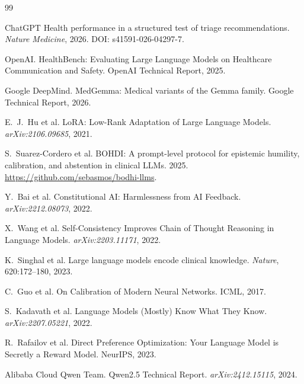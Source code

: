 \documentclass[10pt,letterpaper]{article}
\begin{document}
\begin{thebibliography}{99}
\small

ChatGPT Health performance in a structured test of triage
recommendations. \emph{Nature Medicine}, 2026. DOI: s41591-026-04297-7.

OpenAI. HealthBench: Evaluating Large Language Models on Healthcare
Communication and Safety. OpenAI Technical Report, 2025.

Google DeepMind. MedGemma: Medical variants of the Gemma family.
Google Technical Report, 2026.

E.~J.~Hu et al. LoRA: Low-Rank Adaptation of Large Language Models.
\emph{arXiv:2106.09685}, 2021.

S.~Suarez-Cordero et al. BOHDI: A prompt-level protocol for epistemic
humility, calibration, and abstention in clinical LLMs. 2025.
\url{https://github.com/sebasmos/bodhi-llms}.

Y.~Bai et al. Constitutional AI: Harmlessness from AI Feedback.
\emph{arXiv:2212.08073}, 2022.

X.~Wang et al. Self-Consistency Improves Chain of Thought Reasoning
in Language Models. \emph{arXiv:2203.11171}, 2022.

K.~Singhal et al. Large language models encode clinical knowledge.
\emph{Nature}, 620:172--180, 2023.

C.~Guo et al. On Calibration of Modern Neural Networks. ICML, 2017.

S.~Kadavath et al. Language Models (Mostly) Know What They Know.
\emph{arXiv:2207.05221}, 2022.

R.~Rafailov et al. Direct Preference Optimization: Your Language
Model is Secretly a Reward Model. NeurIPS, 2023.

Alibaba Cloud Qwen Team. Qwen2.5 Technical Report.
\emph{arXiv:2412.15115}, 2024.

\end{thebibliography}
\end{document}
